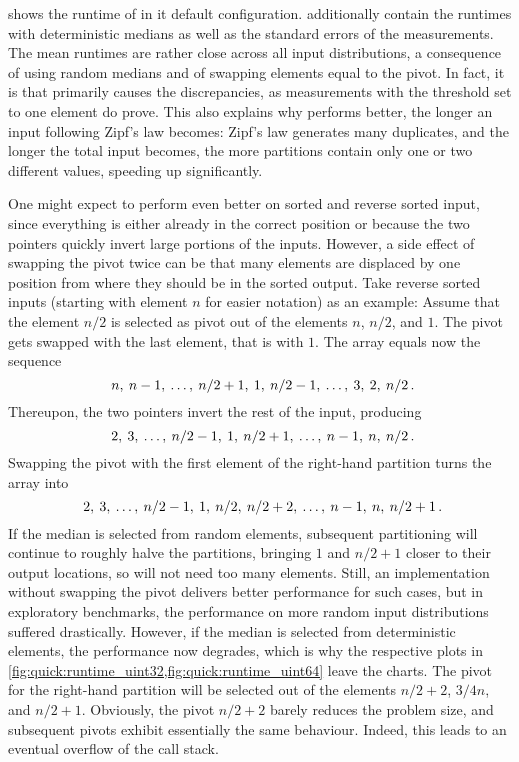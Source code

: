 shows the runtime of \QS{} in it default configuration.
 additionally contain the runtimes with deterministic medians as well as the standard errors of the measurements.
The mean runtimes are rather close across all input distributions, a consequence of using random medians and of swapping elements equal to the pivot.
In fact, it is \IS{} that primarily causes the discrepancies, as measurements with the threshold set to one element do prove.
This also explains why \QS{} performs better, the longer an input following Zipf's law becomes:
Zipf's law generates many duplicates, and the longer the total input becomes, the more partitions contain only one or two different values, speeding \IS{} up significantly.

One might expect \QS{} to perform even better on sorted and reverse sorted input, since everything is either already in the correct position or because the two pointers quickly invert large portions of the inputs.
However, a side effect of swapping the pivot twice can be that many elements are displaced by one position from where they should be in the sorted output.
Take reverse sorted inputs (starting with element \(n\) for easier notation) as an example:
Assume that the element \(n/2\) is selected as pivot out of the elements \(n\), \(n/2\), and \(1\).
The pivot gets swapped with the last element, that is with \(1\).
The array equals now the sequence
\begin{equation*}
	n, \: n - 1, \: \dots, \: n/2 + 1, \: 1, \: n/2 - 1, \: \dots, \: 3, \: 2, \: n/2 \mperiod
\end{equation*}
Thereupon, the two pointers invert the rest of the input, producing
\begin{equation*}
	2, \: 3, \: \dots, \: n/2 - 1, \: 1, \: n/2 + 1, \: \dots, \: n - 1, \: n, \: n/2 \mperiod
\end{equation*}
Swapping the pivot with the first element of the right-hand partition turns the array into
\begin{equation*}
	2, \: 3, \: \dots, \: n/2 - 1, \: 1, \: n/2, \: n/2 + 2, \: \dots, \: n - 1, \: n, \: n/2 + 1 \mperiod
\end{equation*}
If the median is selected from random elements, subsequent partitioning will continue to roughly halve the partitions, bringing \(1\) and \(n/2 + 1\) closer to their output locations, so \IS{} will not need too many elements.
Still, an implementation without swapping the pivot delivers better performance for such cases, but in exploratory benchmarks, the performance on more random input distributions suffered drastically.
However, if the median is selected from deterministic elements, the performance now degrades, which is why the respective plots in \cref{fig:quick:runtime_uint32,fig:quick:runtime_uint64} leave the charts.
The pivot for the right-hand partition will be selected out of the elements \(n/2 + 2\), \(3/4n\), and \(n/2 + 1\).
Obviously, the pivot \(n/2 + 2\) barely reduces the problem size, and subsequent pivots exhibit essentially the same behaviour.
Indeed, this leads to an eventual overflow of the call stack.
